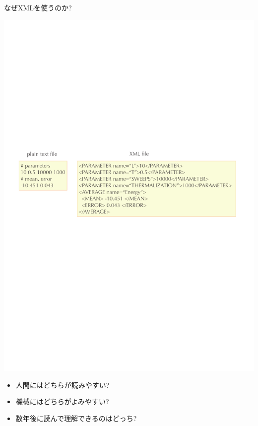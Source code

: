 \subsection*{\redm\whitem\greenb}
\begin{frame}{なぜXMLを使うのか?}
  \begin{center}
    \includegraphics[width=.8\textwidth]{xml3.pdf}
  \end{center}
  \begin{itemize}
  \item 人間にはどちらが読みやすい?
  \item 機械にはどちらがよみやすい?
  \item 数年後に読んで理解できるのはどっち?
  \end{itemize}
\end{frame}

